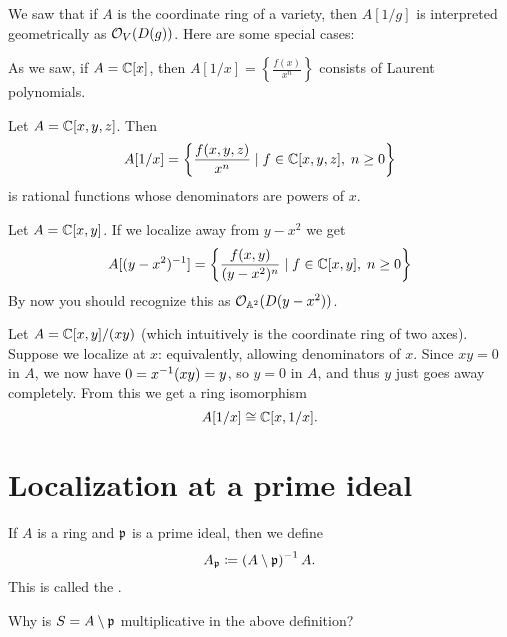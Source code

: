 \begin{example}
	We saw that if $A$ is the coordinate ring of a variety,
	then $A[1/g]$ is interpreted geometrically as $\mathcal O_V(D(g))$.
	Here are some special cases:
	\begin{enumerate}[(a)]
		\ii As we saw, if $A = \mathbb C[x]$,
		then $A[1/x] = \left\{ \frac{f(x)}{x^n} \right\}$
		consists of Laurent polynomials.

		\ii Let $A = \mathbb C[x,y,z]$.
		Then \[ A[1/x] = \left\{ \frac{f(x,y,z)}{x^n} \mid
			f \in \mathbb C[x,y,z], \; n \ge 0 \right\} \]
		is rational functions whose denominators are powers of $x$.

		\ii Let $A = \mathbb C[x,y]$.
		If we localize away from $y-x^2$ we get
		\[ A[(y-x^2)^{-1}] = \left\{ \frac{f(x,y)}{(y-x^2)^n} \mid
			f \in \mathbb C[x,y], \; n \ge 0 \right\} \]
		By now you should recognize this as $\mathcal O_{\mathbb A^2}(D(y-x^2))$.
	\end{enumerate}
\end{example}

\begin{example}
	Let $A = \mathbb C[x,y] / (xy)$
	(which intuitively is the coordinate ring of two axes).
	Suppose we localize at $x$:
	equivalently, allowing denominators of $x$.
	Since $xy = 0$ in $A$, we now have $0 = x^{-1} (xy) = y$,
	so $y = 0$ in $A$, and thus $y$ just goes away completely.
	From this we get a ring isomorphism
	\[ A[1/x] \cong \mathbb C[x,1/x].\] 
\end{example}

\section{Localization at a prime ideal}
\label{sec:localize_prime_ideal}

\begin{definition}
	If $A$ is a ring and $\mathfrak p$ is a prime ideal, then we define
	\[ A_\mathfrak p \coloneqq \left( A \setminus \mathfrak p \right)^{-1} A. \]
	This is called the .
\end{definition}
\begin{ques}
	Why is $S = A \setminus \mathfrak p$ multiplicative
	in the above definition?
\end{ques}



